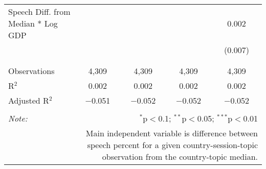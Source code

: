 \begin{table}[!htbp]
\begin{tabular}{@{\extracolsep{5pt}}lcccc}
 Speech Diff. from Median * Log GDP &  &  &  & 0.002 \\ 
  &  &  &  & (0.007) \\ 
  & & & & \\ 
\hline \\[-1.8ex] 
Observations & 4,309 & 4,309 & 4,309 & 4,309 \\ 
R$^{2}$ & 0.002 & 0.002 & 0.002 & 0.002 \\ 
Adjusted R$^{2}$ & $-$0.051 & $-$0.052 & $-$0.052 & $-$0.052 \\ 
\hline 
\hline \\[-1.8ex] 
\textit{Note:}  & \multicolumn{4}{r}{$^{*}$p$<$0.1; $^{**}$p$<$0.05; $^{***}$p$<$0.01} \\ 
 & \multicolumn{4}{r}{Main independent variable is difference between speech percent for a given country-session-topic observation from the country-topic median.} \\ 
\end{tabular} 
\end{table} 
